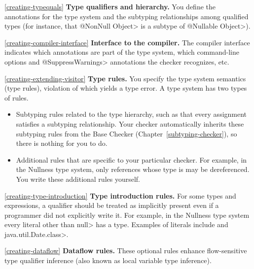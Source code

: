 \begin{description}

\item{\ref{creating-typequals}}
  \textbf{Type qualifiers and hierarchy.}  You define the annotations for
  the type system and the subtyping relationships among qualified types
  (for instance, that \<@NonNull Object> is a subtype of \<@Nullable
  Object>).

\item{\ref{creating-compiler-interface}}
  \textbf{Interface to the compiler.}  The compiler interface indicates
  which annotations are part of the type system, which command-line options
  and \<@SuppressWarnings> annotations the checker recognizes, etc.

\item{\ref{creating-extending-visitor}}
  \textbf{Type rules.}  You specify the type system semantics (type
  rules), violation of which yields a type error.  A type system has two types of
  rules.
\begin{itemize}
\item
  Subtyping rules related to the type hierarchy, such as that every
  assignment
  satisfies a subtyping relationship.
  Your checker automatically inherits these subtyping rules from the Base
  Checker (Chapter~\ref{subtyping-checker}), so there is nothing for you to do.
\item
  Additional rules that are specific to your particular checker.  For
  example, in the Nullness type system, only references whose type is
   may be dereferenced.  You
  write these additional rules yourself.
\end{itemize}

\item{\ref{creating-type-introduction}}
  \textbf{Type introduction rules.}  For some types and
  expressions, a qualifier should be treated as implicitly present even if a
  programmer did not explicitly write it.  For example, in the Nullness
  type system every literal
  other than \<null> has a  type.
  Examples of literals include  and \<java.util.Date.class>.

\item{\ref{creating-dataflow}}
  \textbf{Dataflow rules.}  These optional rules enhance flow-sensitive
  type qualifier inference (also known as local variable type inference).
\end{description}





